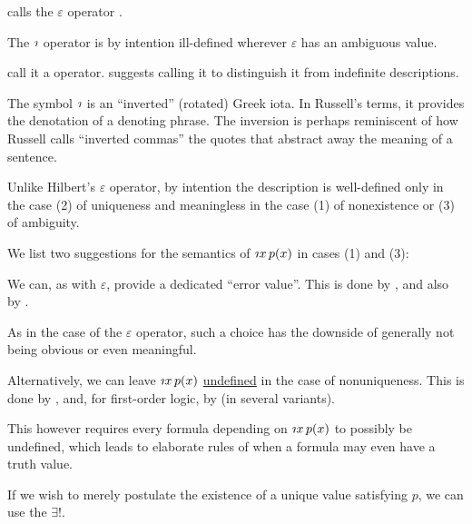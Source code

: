 \begin{concept}
\begin{thmenum}
     calls the \( \varepsilon \) operator .

     The \( \rotiota \) operator is by intention ill-defined wherever \( \varepsilon \) has an ambiguous value.

     call it a  operator.  suggests calling it  to distinguish it from indefinite descriptions.

    The symbol \( \rotiota \) is an \enquote{inverted} (rotated) Greek iota. In Russell's terms, it provides the denotation of a denoting phrase. The inversion is perhaps reminiscent of how Russell calls \enquote{inverted commas} the quotes that abstract away the meaning of a sentence.

    Unlike Hilbert's \( \varepsilon \) operator, by intention the description is well-defined only in the case (2) of uniqueness and meaningless in the case (1) of nonexistence or (3) of ambiguity.

    We list two suggestions for the semantics of  \( \quantifier \rotiota x p(x) \) in cases (1) and (3):
    \begin{thmenum}
       We can, as with \( \varepsilon \), provide a dedicated \enquote{error value}. This is done by , and also by .

      As in the case of the \( \varepsilon \) operator, such a choice has the downside of generally not being obvious or even meaningful.

       Alternatively, we can leave \( \quantifier \rotiota x p(x) \) \hyperref[con:undefinedness]{undefined} in the case of nonuniqueness. This is done by , and, for first-order logic, by  (in several variants).

      This however requires every formula depending on \( \quantifier \rotiota x p(x) \) to possibly be undefined, which leads to elaborate rules of when a formula may even have a truth value.
    \end{thmenum}

     If we wish to merely postulate the existence of a unique value satisfying \( p \), we can use the  \( \exists ! \).


\end{thmenum}
\end{concept}
